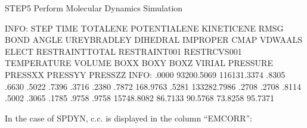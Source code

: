 \documentclass[a4paper,11pt,oneside,english]{sphinxmanual}
\begin{document}
\begin{sphinxVerbatim}[commandchars=\\\{\}]
\PYG{o}{[}STEP5\PYG{o}{]} Perform Molecular Dynamics Simulation

INFO:      STEP           TIME      TOTAL\PYGZus{}ENE  POTENTIAL\PYGZus{}ENE     KINETIC\PYGZus{}ENE
           RMSG           BOND          ANGLE   UREY\PYGZhy{}BRADLEY        DIHEDRAL
       IMPROPER           CMAP        VDWAALS          ELECT RESTRAINT\PYGZus{}TOTAL
   RESTRAINT001   RESTR\PYGZus{}CVS001    TEMPERATURE         VOLUME            BOXX
           BOXY           BOXZ         VIRIAL       PRESSURE         PRESSXX
        PRESSYY        PRESSZZ
\PYGZhy{}\PYGZhy{}\PYGZhy{}\PYGZhy{}\PYGZhy{}\PYGZhy{}\PYGZhy{}\PYGZhy{}\PYGZhy{}\PYGZhy{}\PYGZhy{}\PYGZhy{}\PYGZhy{}\PYGZhy{}\PYGZhy{} \PYGZhy{}\PYGZhy{}\PYGZhy{}\PYGZhy{}\PYGZhy{}\PYGZhy{}\PYGZhy{}\PYGZhy{}\PYGZhy{}\PYGZhy{}\PYGZhy{}\PYGZhy{}\PYGZhy{}\PYGZhy{} \PYGZhy{}\PYGZhy{}\PYGZhy{}\PYGZhy{}\PYGZhy{}\PYGZhy{}\PYGZhy{}\PYGZhy{}\PYGZhy{}\PYGZhy{}\PYGZhy{}\PYGZhy{}\PYGZhy{}\PYGZhy{} \PYGZhy{}\PYGZhy{}\PYGZhy{}\PYGZhy{}\PYGZhy{}\PYGZhy{}\PYGZhy{}\PYGZhy{}\PYGZhy{}\PYGZhy{}\PYGZhy{}\PYGZhy{}\PYGZhy{}\PYGZhy{} \PYGZhy{}\PYGZhy{}\PYGZhy{}\PYGZhy{}\PYGZhy{}\PYGZhy{}\PYGZhy{}\PYGZhy{}\PYGZhy{}\PYGZhy{}\PYGZhy{}\PYGZhy{}\PYGZhy{}\PYGZhy{}\PYGZhy{}
INFO:                .0000    \PYGZhy{}93200.5069   \PYGZhy{}116131.3374      .8305
         .6630       .5022      .7396       .3716       .2380
       .7872      \PYGZhy{}168.9763     .5281   \PYGZhy{}133282.7986        .2708
       .2708         .8114       .5002    .3065         .1785
        .9758        .9758    \PYGZhy{}15748.8082       \PYGZhy{}86.7133        \PYGZhy{}90.5768
       \PYGZhy{}73.8258       \PYGZhy{}95.7371
\end{sphinxVerbatim}

In the case of SPDYN, c.c. is displayed in the column “EMCORR”:
\end{document}
